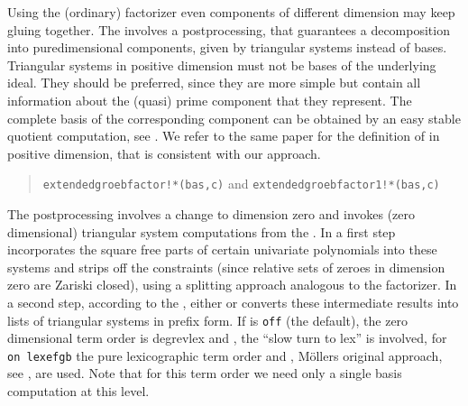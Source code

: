 Using the (ordinary) \gr factorizer even components of different
dimension may keep gluing together. The 
involves a postprocessing, that guarantees a decomposition into
puredimensional components, given by triangular systems instead of \gr
bases. Triangular systems in positive dimension must not be \gr bases
of the underlying ideal. They should be preferred, since they are more
simple but contain all information about the (quasi) prime component
that they represent. The complete \gr basis of the corresponding
component can be obtained by an easy stable quotient computation, see
\cite{efgb}. We refer to the same paper for the definition of
 in positive dimension, that is consistent
with our approach.
\begin{quote}
\verb|extendedgroebfactor!*(bas,c)| and
\verb|extendedgroebfactor1!*(bas,c)|
 

\end{quote}
The postprocessing involves a change to dimension zero and invokes
(zero dimensional) triangular system computations from the
. In a first step 
incorporates the square free parts of certain univariate polynomials
into these systems and strips off the constraints (since relative sets
of zeroes in dimension zero are Zariski closed), using a splitting
approach analogous to the \gr factorizer. In a second step, according
to the , either  or
 converts these intermediate results into lists of
triangular systems in prefix form. If  is {\tt off} (the
default), the zero dimensional term order is degrevlex and
, the ``slow turn to lex'' is involved, for {\tt on
lexefgb} the pure lexicographic term order and ,
M\"ollers original approach, see \cite{Moeller}, are used. Note that
for this term order we need only a single \gr basis computation at
this level.

